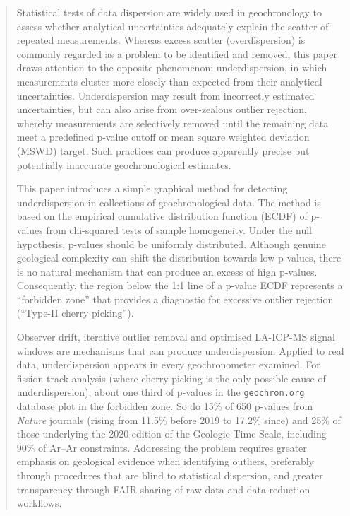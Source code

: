 \documentclass[gchron, manuscript]{copernicus}
\begin{document}
\begin{abstract}
Statistical tests of data dispersion are widely used in geochronology
to assess whether analytical uncertainties adequately explain the
scatter of repeated measurements. Whereas excess scatter
(overdispersion) is commonly regarded as a problem to be identified
and removed, this paper draws attention to the opposite phenomenon:
underdispersion, in which measurements cluster more closely than
expected from their analytical uncertainties. Underdispersion may
result from incorrectly estimated uncertainties, but can also arise
from over-zealous outlier rejection, whereby measurements are
selectively removed until the remaining data meet a predefined p-value
cutoff or mean square weighted deviation (MSWD) target. Such practices
can produce apparently precise but potentially inaccurate
geochronological estimates.

This paper introduces a simple graphical method for detecting
underdispersion in collections of geochronological data. The method is
based on the empirical cumulative distribution function (ECDF) of
p-values from chi-squared tests of sample homogeneity. Under the null
hypothesis, p-values should be uniformly distributed. Although genuine
geological complexity can shift the distribution towards low p-values,
there is no natural mechanism that can produce an excess of high
p-values. Consequently, the region below the 1:1 line of a p-value
ECDF represents a ``forbidden zone'' that provides a diagnostic for
excessive outlier rejection (``Type-II cherry picking'').

Observer drift, iterative outlier removal and optimised LA-ICP-MS
signal windows are mechanisms that can produce underdispersion.
Applied to real data, underdispersion appears in every geochronometer
examined. For fission track analysis (where cherry picking is the only
possible cause of underdispersion), about one third of p-values in the
\texttt{geochron.org} database plot in the forbidden zone. So do 15\%
of 650 p-values from \emph{Nature} journals (rising from 11.5\% before
2019 to 17.2\% since) and 25\% of those underlying the 2020 edition of
the Geologic Time Scale, including 90\% of Ar--Ar constraints.
Addressing the problem requires greater emphasis on geological
evidence when identifying outliers, preferably through procedures that
are blind to statistical dispersion, and greater transparency through
FAIR sharing of raw data and data-reduction workflows.
\end{abstract}

\introduction\label{sec:intro}
\end{document}
